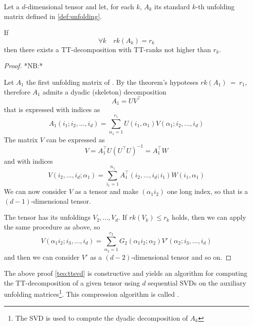 \begin{Teo} \label{teo:ttsvd}
  Let \A a $d$-dimensional tensor and let, for each $k$, $A_k$ its standard $k$-th unfolding matrix defined in \ref{def:unfolding}.

  If
  \begin{equation*}
    \forall k \quad rk(A_k) = r_k
  \end{equation*}
  then there exists a TT-decomposition with TT-ranks not higher than $r_k$.

  \begin{proof}
    *NB:*

    Let $A_1$ the first unfolding matrix of \A. By the theorem's hypoteses $rk(A_1)~=~r_1$, therefore $A_1$ admits a dyadic (skeleton) decomposition
    \begin{equation*}
      A_1 = UV^\top
    \end{equation*}
    that is expressed with indices as
    \begin{equation*}
      A_1(i_1;i_2,\ldots,i_d) = \sum_{\alpha_1 = 1}^{r_1} U(i_1,\alpha_1) V(\alpha_1;i_2,\ldots,i_d)
    \end{equation*}
    The matrix $V$ can be expressed as
    \begin{equation*}
      V = A_1^\top U (U^\top U)^{-1} = A_1^\top W
    \end{equation*}
    and with indices
    \begin{equation*}
      V(i_2,\ldots,i_d;\alpha_1) = \sum_{i_1 = 1}^{n_1} A_1^\top(i_2,\ldots,i_d;i_1) W(i_1,\alpha_1)
    \end{equation*}
    We can now consider $V$ as a tensor and make $(\alpha_1 i_2)$ one long index, so that \V is a $(d-1)$-dimensional tensor.

    The tensor \V has its unfoldings $V_2,\ldots,V_d$. If $rk(V_k) \leq r_k$ holds, then we can apply the same procedure as above, so
    \begin{equation*}
      V(\alpha_1 i_2;i_3,\ldots,i_d) = \sum_{\alpha_2=1}^{r_2} G_2(\alpha_1 i_2;\alpha_2) V'(\alpha_2;i_3,\ldots,i_d)
    \end{equation*}
    and then we can consider $V'$ as a $(d-2)$-dimensional tensor and so on.
    
  \end{proof}
  
\end{Teo}

The above proof \ref{teo:ttsvd} is constructive and yields an algorithm for computing the TT-decomposition of a given tensor using $d$ sequential SVDs on the auxiliary unfolding matrices\footnote{The SVD is used to compute the dyadic decomposition of $A_k$}. This  compression algorithm is called .

